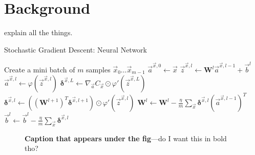 \chapter{Background}\label{chap:background}
explain all the things.

\begin{algorithm}[p]
\caption{Stochastic Gradient Descent: Neural Network}
\label{alg:backpropnn}
\begin{algorithmic}
    \State Create a mini batch of $m$ samples $\vec{x}_0 \ldots \vec{x}_{m-1}$
        \State $\vec{a}^{\vec{x},0} \gets \vec{x}$  
          
            \State $\vec{z}^{\vec{x},l} \gets \mathbf{W}^l \vec{a}^{\vec{x},l-1}+\vec{b}^l$
            \State $\vec{a}^{\vec{x},l} \gets \varphi(\vec{z}^{\vec{x},l})$
        \EndFor
        \State $\bm{\delta}^{\vec{x},L} \gets \nabla_{\vec{a}} C_\vec{x} \odot \varphi'(\vec{z}^{\vec{x},L})$ 
          
            \State $\bm{\delta}^{\vec{x},l} \gets ((\mathbf{W}^{l+1})^T \bm{\delta}^{\vec{x},l+1})\odot \varphi'(\vec{z}^{\vec{x},l})$
        \EndFor
    \EndFor
     
        \State $ \mathbf{W}^l \gets \mathbf{W}^l-\frac{\eta}{m} \sum_\vec{x} \bm{\delta}^{\vec{x},l} (\vec{a}^{\vec{x},l-1})^T$
        \State $\vec{b}^l \gets \vec{b}^l-\frac{\eta}{m}\sum_\vec{x} \bm{\delta}^{\vec{x},l}$
    \EndFor
\end{algorithmic}
\end{algorithm}

\begin{figure}[t]
\begin{centering}
    \caption[Caption that appears in the figlist]{\textbf{Caption that appears under the fig}---do I want this in bold tho?}
    \label{fig:pcaclasses}
\end{centering}
\end{figure}
